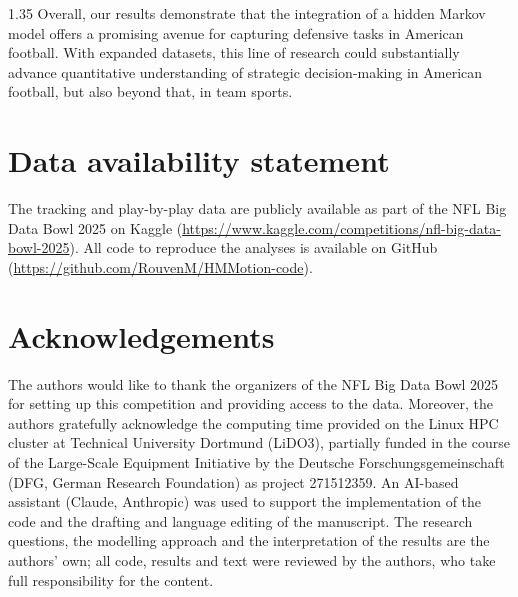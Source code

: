 \documentclass[12pt,a4paper]{article}
\begin{document}
\begin{spacing}{1.35}
Overall, our results demonstrate that the integration of a hidden Markov model offers a promising avenue for capturing defensive tasks in American football. With expanded datasets, this line of research could substantially advance quantitative understanding of strategic decision-making in American football, but also beyond that, in team sports.

\section*{Data availability statement}

The tracking and play-by-play data are publicly available as part of the NFL Big Data Bowl 2025 on Kaggle (\url{https://www.kaggle.com/competitions/nfl-big-data-bowl-2025}). All code to reproduce the analyses is available on GitHub (\url{https://github.com/RouvenM/HMMotion-code}).


\section*{Acknowledgements}
The authors would like to thank the organizers of the NFL Big Data Bowl 2025 for setting up this competition and providing access to the data.
Moreover, the authors gratefully acknowledge the computing time provided on the Linux HPC cluster at Technical University Dortmund (LiDO3), partially funded in the course of the Large-Scale Equipment Initiative by the Deutsche Forschungsgemeinschaft (DFG, German Research Foundation) as project 271512359. An AI-based assistant (Claude, Anthropic) was used to support the implementation of the code and the drafting and language editing of the manuscript. The research questions, the modelling approach and the interpretation of the results are the authors' own; all code, results and text were reviewed by the authors, who take full responsibility for the content.
%


\end{spacing}
\end{document}
